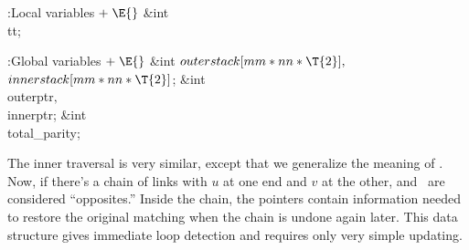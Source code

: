 \B{}:Local variables\X${}\mathrel+\E{}$\6
\&{int} \\{tt};\par
\fi

\B{}:Global variables\X${}\mathrel+\E{}$\6
\&{int} ${}\\{outerstack}[\\{mm}*\\{nn}*\T{2}],{}$ ${}\\{innerstack}[\\{mm}*%
\\{nn}*\T{2}]{}$;\6
\&{int} \\{outerptr}${},{}$ \\{innerptr};\6
\&{int} \\{total\_parity};%
\par
\fi

The inner traversal is very similar, except that we generalize the
meaning
of . Now, if there's a chain of links with $u$ at one end and $v$
at the
other,  and~ are considered ``opposites.'' Inside the chain,
the 
pointers contain information needed to restore the original matching when the
chain is undone again later. This data structure gives immediate loop
detection and requires only very simple updating.

